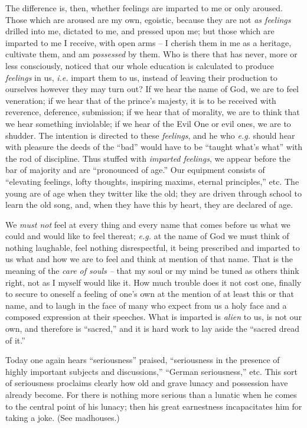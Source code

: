 \documentclass[12pt,a4paper]{book}
\begin{document}
The difference is, then, whether feelings are imparted to me or only aroused. 
Those which are aroused are my own, egoistic, because they are not \textit{as 
feelings} drilled into me, dictated to me, and pressed upon me; but those 
which are imparted to me I receive, with open arms -- I cherish them in me as 
a heritage, cultivate them, and am \textit{possessed} by them. Who is there 
that has never, more or less consciously, noticed that our whole education is 
calculated to produce \textit{feelings} in us, \textit{i.e.} impart them to 
us, instead of leaving their production to ourselves however they may turn 
out? If we hear the name of God, we are to feel veneration; if we hear that of 
the prince's majesty, it is to be received with reverence, deference, 
submission; if we hear that of morality, we are to think that we hear 
something inviolable; if we hear of the Evil One or evil ones, we are to 
shudder. The intention is directed to these \textit{feelings}, and he who 
\textit{e.g.} should hear with pleasure the deeds of the ``bad'' would have 
to be ``taught what's what'' with the rod of discipline. Thus stuffed with 
\textit{imparted feelings}, we appear before the bar of majority and are 
``pronounced of age.'' Our equipment consists of ``elevating feelings, 
lofty thoughts, inspiring maxims, eternal principles,'' etc. The young are of 
age when they twitter like the old; they are driven through school to learn 
the old song, and, when they have this by heart, they are declared of age.

We \textit{must not} feel at every thing and every name that comes before us 
what we could and would like to feel thereat; \textit{e.g.} at the name of 
God we must think of nothing laughable, feel nothing disrespectful, it being 
prescribed and imparted to us what and how we are to feel and think at mention 
of that name. That is the meaning of the \textit{care of souls --} that my 
soul or my mind be tuned as others think right, not as I myself would like it. 
How much trouble does it not cost one, finally to secure to oneself a feeling 
of one's own at the mention of at least this or that name, and to laugh in the 
face of many who expect from us a holy face and a composed expression at their 
speeches. What is imparted is \textit{alien} to us, is not our own, and 
therefore is ``sacred,'' and it is hard work to lay aside the ``sacred 
dread of it.''

Today one again hears ``seriousness'' praised, ``seriousness in the 
presence of highly important subjects and discussions,'' ``German 
seriousness,'' etc. This sort of seriousness proclaims clearly how old and 
grave lunacy and possession have already become. For there is nothing more 
serious than a lunatic when he comes to the central point of his lunacy; then 
his great earnestness incapacitates him for taking a joke. (See madhouses.)
\end{document}
